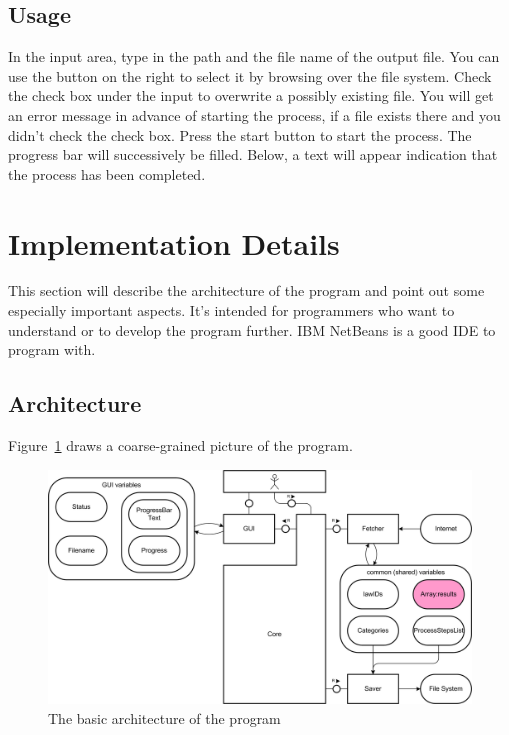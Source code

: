 \documentclass{scrartcl}
\begin{document}
\subsection{Usage}
In the input area, type in the path and the file name of the output file. You can use the button on the right to select it by browsing over the file system. Check the check box under the input to overwrite a possibly existing file. You will get an error message in advance of starting the process, if a file exists there and you didn't check the check box. Press the start button to start the process. The progress bar will successively be filled. Below, a text will appear indication that the process has been completed.





\section{Implementation Details}
This section will describe the architecture of the program and point out some especially important aspects. It's intended for programmers who want to understand or to develop the program further. IBM NetBeans is a good IDE to program with.



\subsection{Architecture}
Figure~\ref{Architecture} draws a coarse-grained picture of the program.
\clearpage

  \begin{figure}[ht]
  \begin{center}
  \includegraphics[width = \textwidth]{Architecture.png}
  \caption{The basic architecture of the program}
  \label{Architecture}
  \end{center}
  \end{figure}
\end{document}
